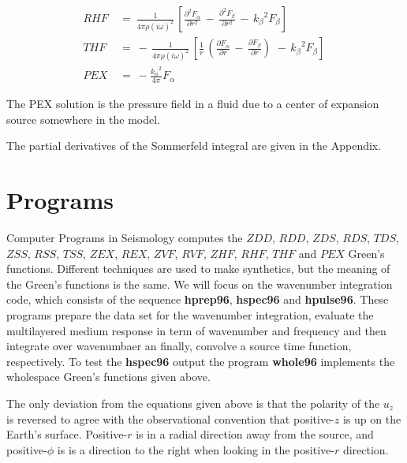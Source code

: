 \documentclass{article}
\begin{document}
\begin{align*}
RHF \   &= \  { \frac{1 }{  { 4 \pi \rho ( i \omega )^2 } } } \, \left[ { \frac{ \partial^2 F_{\alpha}   }{  \partial r^2 } } \,-\, { \frac{ \partial^2 F_{\beta}   }{  \partial r^2 } }  \,-\, {{ k_{\beta} }}^2 { { F_{\beta} }} \right] \, \\
THF \   &= \ -\, { \frac{1 }{  { 4 \pi \rho ( i \omega )^2 } } } \, \left[ { \frac{1 }{ r }} { \, \left( { \frac{ \partial F_{\alpha}   }{  \partial r } } \,-\, { \frac{ \partial F_{\beta}   }{  \partial r } } \right) \, }  \,-\, {{ k_{\beta} }}^2 { { F_{\beta} }} \right]\, \\
PEX \   &= \  - { \frac{{{ k_{\alpha} }}^2   }{  4 \pi   } } { { F_{\alpha} }}
\end{align*}

The PEX solution is the pressure field in a fluid due to a
center of expansion
source somewhere in the model.

The partial derivatives of the Sommerfeld integral are given in the Appendix.


\section{Programs}

Computer Programs in Seismology computes the $ZDD$, $RDD$, $ZDS$, $RDS$, $TDS$, $ZSS$, $RSS$, $TSS$, $ZEX$, $REX$, $ZVF$, $RVF$, $ZHF$, $RHF$, $THF$ and $PEX$ Green's functions.
Different techniques are used to make synthetics, but the meaning of the Green's functions is the same. We will focus on the wavenumber integration code, which consists of the sequence
{\bf hprep96}, {\bf hspec96} and {\bf hpulse96}. These programs prepare the data set for the wavenumber integration, evaluate the multilayered medium response in term of wavenumber and frequency and then integrate over wavenumbaer an finally, convolve a source time function, respectively. To test the {\bf hspec96} output the program {\bf whole96} implements the wholespace Green's functions given above.

The only deviation from the equations given above is that the polarity of the $u_z$ is reversed to agree with the observational convention that positive-$z$ is up on the Earth's surface. Positive-$r$ is in a radial direction away from the source, and positive-${\phi}$ is is a direction to the right when looking in the positive-$r$ direction.
\end{document}
